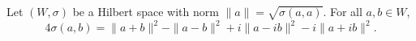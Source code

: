 Let $(W, \sigma)$ be a Hilbert space with norm $\|a\| = \sqrt{\sigma(a, a)}$. For all $a, b \in W$,
$$
4\sigma(a, b) = \|a + b\|^2 - \|a - b\|^2 + i\|a - ib\|^2 - i\|a + ib\|^2.
$$
